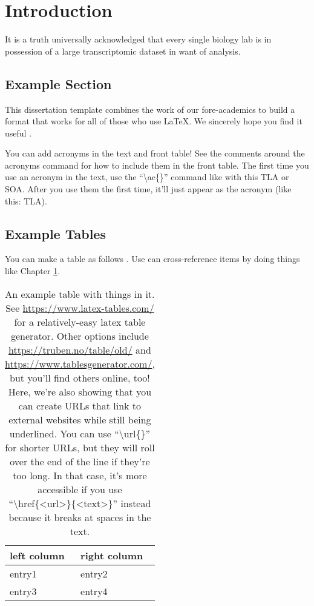 \chapter{Introduction}
\label{chpt:introduction}

It is a truth universally acknowledged that every single biology lab is in possession of a large transcriptomic dataset in want of analysis.

\section{Example Section}
\label{sec:examplesec1}

This dissertation template combines the work of our fore-academics to build a format that works for all of those who use \LaTeX \cite{jefferson2019policing}. We sincerely hope you find it useful \cite{shannon1948mathematical}.

You can add acronyms in the text and front table! See the comments around the acronyms command for how to include them in the front table. The first time you use an acronym in the text, use the ``\textbackslash ac\{\}'' command like with this \ac{TLA} or \ac{SOA}. After you use them the first time, it'll just appear as the acronym (like this: \ac{TLA}).

\blindtext


\section{Example Tables}
\label{sec:examplesec2}

You can make a table as follows \cite{ong1997gilbert}. Use can cross-reference items by doing things like Chapter \ref{chpt:introduction}.

\blindtext

\begin{table}[ht]
    \begin{tabular}{l|l}
        \textbf{left column} & \textbf{right column} \\ \hline
        entry1 & entry2 \\
        entry3 & entry4
    \end{tabular}
    \caption{An example table with things in it. See \url{https://www.latex-tables.com/} for a relatively-easy latex table generator. Other options include \url{https://truben.no/table/old/} and \url{https://www.tablesgenerator.com/}, but you'll find others online, too! Here, we're also showing that you can create URLs that link to external websites while still being underlined. You can use ``\textbackslash url\{\}'' for shorter URLs, but they will roll over the end of the line if they're too long. In that case, it's more accessible if you use ``\textbackslash href\{\textless url\textgreater\}\{\textless text\textgreater\}'' instead because it breaks at spaces in the text.}
    \label{tab:my-table}
\end{table}

